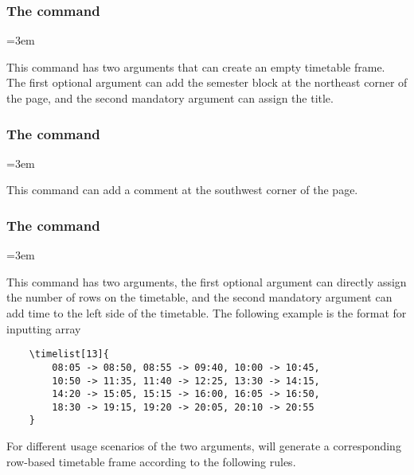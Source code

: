 \documentclass[letterpaper]{l3doc}
\newenvironment{example}{\begin{list}{}{\leftmargin=3em}\item }{\end{list}}
\begin{document}
\subsubsection{The  command}

\begin{example}
\end{example}

This command has two arguments that can create an empty timetable frame. The first optional argument can add the semester block at the northeast corner of the page, and the second mandatory argument can assign the title.

\subsubsection{The  command}

\begin{example}
\end{example}

This command can add a comment at the southwest corner of the page.

\subsubsection{The  command}

\begin{example}
\end{example}

This command has two arguments, the first optional argument  can directly assign the number of rows on the timetable, and the second mandatory argument  can add time to the left side of the timetable. The following example is the format for inputting array

\begin{Verbatim}
    \timelist[13]{
        08:05 -> 08:50, 08:55 -> 09:40, 10:00 -> 10:45,
        10:50 -> 11:35, 11:40 -> 12:25, 13:30 -> 14:15,
        14:20 -> 15:05, 15:15 -> 16:00, 16:05 -> 16:50,
        18:30 -> 19:15, 19:20 -> 20:05, 20:10 -> 20:55
    }
\end{Verbatim}

For different usage scenarios of the two arguments,  will generate a corresponding row-based timetable frame according to the following rules.
\end{document}
